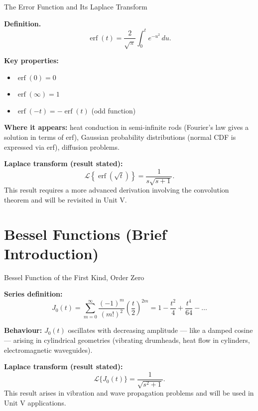 \documentclass[12pt,a4paper]{article}
\begin{document}
\begin{infobox}{The Error Function and Its Laplace Transform}

\textbf{Definition.}
\[
  \operatorname{erf}(t) = \frac{2}{\sqrt{\pi}} \int_0^{t} e^{-u^2}\, du.
\]

\textbf{Key properties:}
\begin{itemize}
  \item $\operatorname{erf}(0) = 0$
  \item $\operatorname{erf}(\infty) = 1$
  \item $\operatorname{erf}(-t) = -\operatorname{erf}(t)$ (odd function)
\end{itemize}

\textbf{Where it appears:} heat conduction in semi-infinite rods (Fourier's
law gives a solution in terms of erf), Gaussian probability distributions
(normal CDF is expressed via erf), diffusion problems.

\textbf{Laplace transform (result stated):}
\[
  \mathcal{L}\!\left\{\operatorname{erf}\!\left(\sqrt{t}\right)\right\}
  = \frac{1}{s\sqrt{s+1}}.
\]
This result requires a more advanced derivation involving the convolution
theorem and will be revisited in Unit V.

\end{infobox}

\section{Bessel Functions (Brief Introduction)}

\begin{infobox}{Bessel Function of the First Kind, Order Zero}

\textbf{Series definition:}
\[
  J_0(t) = \sum_{m=0}^{\infty} \frac{(-1)^m}{(m!)^2}
            \left(\frac{t}{2}\right)^{2m}
  = 1 - \frac{t^2}{4} + \frac{t^4}{64} - \ldots
\]

\textbf{Behaviour:} $J_0(t)$ oscillates with decreasing amplitude --- like a
damped cosine --- arising in cylindrical geometries (vibrating drumheads,
heat flow in cylinders, electromagnetic waveguides).

\textbf{Laplace transform (result stated):}
\[
  \mathcal{L}\{J_0(t)\} = \frac{1}{\sqrt{s^2 + 1}}.
\]
This result arises in vibration and wave propagation problems and will be used
in Unit V applications.

\end{infobox}
\end{document}
